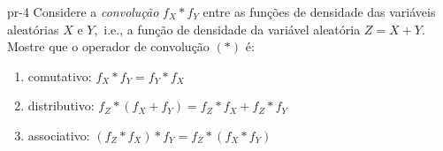 %
%






\begin{problema}{}{pr-4}
	Considere  a {\it convolução} $f_X * f_Y$ entre as funções de densidade das variáveis aleatórias  $X$ e $Y,$ i.e., a função de densidade da variável aleatória $Z=X+Y.$ Mostre que o operador de convolução $ ( * )$ é: 
	\begin{enumerate}
		\item comutativo: $f_X * f_Y = f_Y * f_X$
		\item distributivo: $f_Z*(f_X+f_Y ) = f_Z*f_X+f_Z*f_Y$
		\item  associativo: $(f_Z * f_X) * f_Y = f_Z *(f_X * f_Y )$
	\end{enumerate}
\end{problema}

\bigskip
\centering {\scshape\bf\textcolor{darkred}{BOA PROVA}}

%




